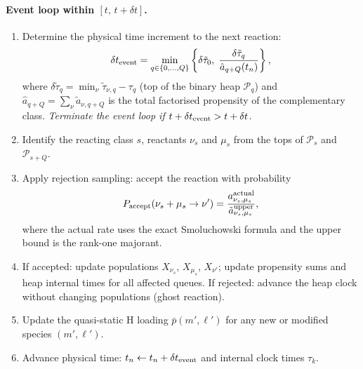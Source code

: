 \paragraph{Event loop within $[t,\,t+\delta t]$.}
\begin{enumerate}
  \item Determine the physical time increment to the next reaction:
        \begin{equation}\label{eq:hybrid_dt}
            \delta t_{\rm event}
            = \min_{q \in \{0,\ldots,Q\}}
              \left\{
                \delta\tilde{\tau}_0,\;
                \frac{\delta\tilde{\tau}_q}{\hat{a}_{q+Q}(t_n)}
              \right\},
        \end{equation}
        where $\delta\tilde{\tau}_q = \min_\nu \tilde{\tau}_{\nu,q} -
        \tau_q$ (top of the binary heap $\mathcal{P}_q$) and
        $\hat{a}_{q+Q} = \sum_\nu \tilde{a}_{\nu,q+Q}$ is the
        total factorised propensity of the complementary class.
        \emph{Terminate the event loop if
        $t + \delta t_{\rm event} > t + \delta t$.}
  \item Identify the reacting class $s$, reactants $\nu_s$ and
        $\mu_s$ from the tops of $\mathcal{P}_s$ and
        $\mathcal{P}_{s+Q}$.
  \item Apply rejection sampling: accept the reaction with
        probability
        \begin{equation}\label{eq:accept_prob}
            P_{\rm accept}(\nu_s + \mu_s \to \nu')
            = \frac{a_{\nu_s,\mu_s}^{\rm actual}}
                   {\tilde{a}_{\nu_s,\mu_s}^{\rm upper}},
        \end{equation}
        where the actual rate uses the exact Smoluchowski formula
        and the upper bound is the rank-one majorant.
  \item If accepted: update populations
        $X_{\nu_s}$, $X_{\mu_s}$, $X_{\nu'}$; update propensity
        sums and heap internal times for all affected queues.
        If rejected: advance the heap clock without changing
        populations (ghost reaction).
  \item Update the quasi-static H loading $\bar{p}(m',\ell')$ for
        any new or modified species $(m',\ell')$.
  \item Advance physical time: $t_n \leftarrow t_n + \delta t_{\rm event}$
        and internal clock times $\tau_k$.
\end{enumerate}

